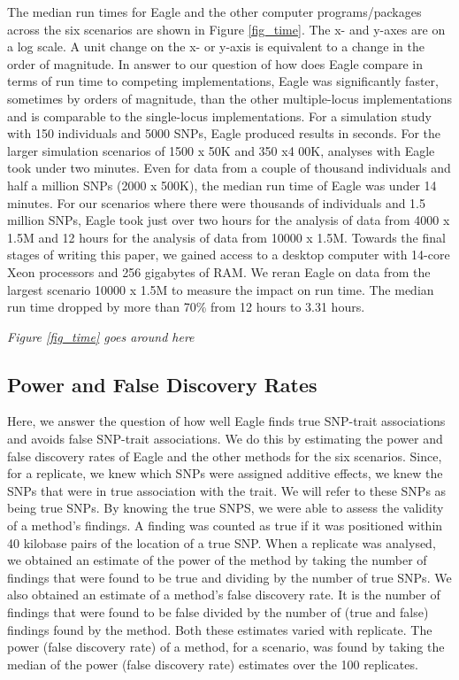 \documentclass{nature}
\begin{document}
The median run times for Eagle and the other computer programs/packages across the six scenarios are shown in Figure \ref{fig_time}. 
The x- and y-axes are on a log scale.  A unit change on the x- or y-axis is equivalent to a change in the order of magnitude.  
In answer to our question of how does Eagle compare in terms of run time to competing implementations, 
Eagle was significantly faster, sometimes by orders of magnitude,  than the other multiple-locus
 implementations and is comparable to the single-locus implementations. For a simulation study with 150 individuals and 
 5000 SNPs, Eagle produced results in seconds.  For the larger simulation scenarios of 1500 x  50K and 350 x4 00K, 
 analyses with Eagle took under two minutes. Even for data from a couple of thousand individuals and half a million 
 SNPs (2000 x 500K), the median run time of Eagle was under 14 minutes. For our scenarios where there 
 were thousands of individuals and 1.5 million SNPs, Eagle took just over two hours for the analysis of data from 
 4000 x 1.5M and  12 hours for the analysis of data from 10000 x 1.5M. 
 Towards the final stages of writing this paper, 
 we gained access to a desktop computer with 14-core Xeon processors and 256 gigabytes of RAM. We reran Eagle on data from the largest
  scenario 10000 x 1.5M to measure the impact on run time. The median run time dropped by more than 70\% 
  from 12 hours to 3.31 hours. 
 
 {\em Figure \ref{fig_time} goes around here}




\subsection{Power and False Discovery Rates}

Here, we answer the question of how well Eagle finds true SNP-trait associations and avoids false SNP-trait associations. We do this by estimating the power and false discovery rates of Eagle and the other methods for the six scenarios.  Since, for a replicate, we knew which SNPs were assigned additive effects, we knew the SNPs that were in true association with the trait. We will refer to these SNPs as being
true SNPs. By knowing the true SNPS, we were able to assess the validity of a method's findings. A  finding was counted as true if it was positioned within 40 kilobase pairs of the location of a true SNP. When a replicate was analysed, we obtained an estimate of the power of the method by taking  the number of findings that were found to be  true and dividing by the 
number of true SNPs. We also obtained an estimate of a method's false discovery rate. It is the number of findings that were found to be false divided by the number of (true and false) findings found by the method.  Both these estimates varied with replicate. 
The power (false discovery rate) of a method, for a scenario, was found by taking the median of the power (false discovery rate) estimates over the 100 replicates. 
\end{document}
